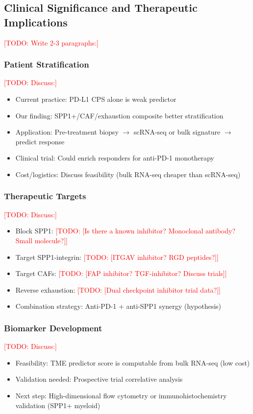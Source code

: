 \documentclass[12pt,oneside]{article}
\newcommand{\TODO}[1]{\textcolor{red}{[TODO: #1]}}
\begin{document}
\subsection{Clinical Significance and Therapeutic Implications}
\TODO{Write 2-3 paragraphs:}

\subsubsection*{Patient Stratification}
\TODO{Discuss:}
\begin{itemize}
    \item Current practice: PD-L1 CPS alone is weak predictor
    \item Our finding: SPP1+/CAF/exhaustion composite better stratification
    \item Application: Pre-treatment biopsy $\to$ scRNA-seq or bulk signature $\to$ predict response
    \item Clinical trial: Could enrich responders for anti-PD-1 monotherapy
    \item Cost/logistics: Discuss feasibility (bulk RNA-seq cheaper than scRNA-seq)
\end{itemize}

\subsubsection*{Therapeutic Targets}
\TODO{Discuss:}
\begin{itemize}
    \item Block SPP1: \TODO{[Is there a known inhibitor? Monoclonal antibody? Small molecule?]}
    \item Target SPP1-integrin: \TODO{[ITGAV inhibitor? RGD peptides?]}
    \item Target CAFs: \TODO{[FAP inhibitor? TGF-\beta inhibitor? Discuss trials]}
    \item Reverse exhaustion: \TODO{[Dual checkpoint inhibitor trial data?]}
    \item Combination strategy: Anti-PD-1 + anti-SPP1 synergy (hypothesis)
\end{itemize}

\subsubsection*{Biomarker Development}
\TODO{Discuss:}
\begin{itemize}
    \item Feasibility: TME predictor score is computable from bulk RNA-seq (low cost)
    \item Validation needed: Prospective trial correlative analysis
    \item Next step: High-dimensional flow cytometry or immunohistochemistry validation (SPP1+ myeloid)
\end{itemize}
\end{document}
